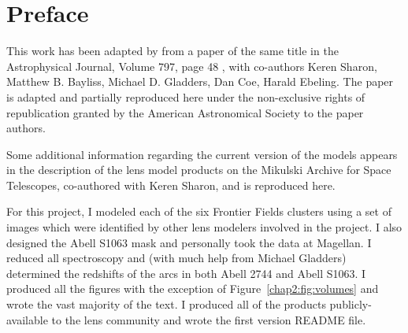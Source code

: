 \section{Preface}

%

This work has been adapted by from a paper of the same title in the Astrophysical Journal, Volume 797, page 48 \citep{Johnson:2014tg}, with co-authors Keren Sharon, Matthew B. Bayliss, Michael D. Gladders, Dan Coe, Harald Ebeling. The paper is adapted and partially reproduced here under the non-exclusive rights of republication granted by the American Astronomical Society to the paper authors.

Some additional information regarding the current version of the models appears in the description of the lens model products on the Mikulski Archive for Space Telescopes, co-authored with Keren Sharon, and is reproduced here.

For this project, I modeled each of the six Frontier Fields clusters using a set of images which were identified by other lens modelers involved in the project. I also designed the Abell S1063 mask and personally took the data at Magellan. I reduced all spectroscopy and (with much help from Michael Gladders) determined the redshifts of the arcs in both Abell 2744 and Abell S1063. I produced all the figures with the exception of Figure~\ref{chap2:fig:volumes} and wrote the vast majority of the text. I produced all of the products publicly-available to the lens community and wrote the first version README file.

